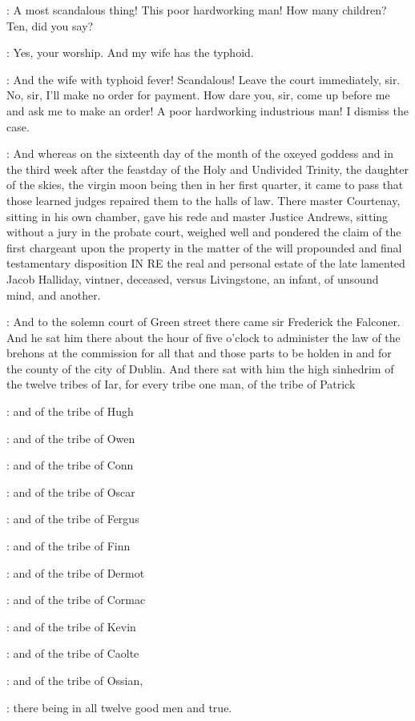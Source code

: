 \bergan:
A most scandalous thing!
This poor hardworking man!
How many
children?
Ten,
did you say?

\bergan:
Yes,
your worship.
And my wife has the typhoid.

\bergan:
And the wife with typhoid fever!
Scandalous!
Leave the court
immediately,
sir.
No,
sir,
I'll make no order for payment.
How dare you,
sir,
come up before me and ask me to make an order!
A poor hardworking
industrious man!
I dismiss the case.

:
And whereas on the sixteenth day of the month of the oxeyed goddess and in
the third week after the feastday of the Holy and Undivided Trinity,
the daughter of the skies,
the virgin moon being then in her first
quarter,
it came to pass that those learned judges repaired them to the
halls of law.
There master Courtenay,
sitting in his own chamber,
gave his rede and master Justice Andrews,
sitting without a jury
in the probate court,
weighed well and pondered the claim of the
first chargeant upon the property in the matter of the will
propounded and final testamentary disposition IN RE the real and
personal estate of the late lamented Jacob Halliday,
vintner,
deceased,
versus Livingstone,
an infant,
of unsound mind,
and another.

:
And to the
solemn court of Green street there came sir Frederick the Falconer.
And he
sat him there about the hour of five o'clock to administer the law of the
brehons at the commission for all that and those parts to be holden in
and for the county of the city of Dublin.
And there sat with him the high
sinhedrim of the twelve tribes of Iar,
for every tribe one man,
of the tribe of Patrick

:
and of the tribe of Hugh

:
and of the tribe of Owen

:
and of the tribe of Conn

:
and of the tribe of Oscar

:
and of the tribe of Fergus

:
and of the tribe of Finn

:
and of the tribe of Dermot

:
and of the tribe of Cormac

:
and of the tribe of Kevin

:
and of the tribe of Caolte

:
and of the tribe of Ossian,

:
there being in all
twelve good men and true.

